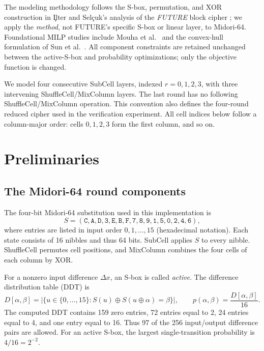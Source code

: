 \documentclass[11pt,a4paper]{article}
\begin{document}
The modeling methodology follows the S-box, permutation, and XOR construction
in \c{I}lter and Sel\c{c}uk's analysis of the \emph{FUTURE} block cipher
\cite{ilter2023}; we apply the \emph{method}, not FUTURE's specific S-box or linear
layer, to Midori-64. Foundational MILP studies include Mouha et al.~\cite{mouha2012} and the convex-hull formulation of Sun et al.~\cite{sun2014}. All component constraints are retained unchanged between the active-S-box
and probability optimizations; only the objective function is changed.

We model four consecutive SubCell layers, indexed $r=0,1,2,3$, with three
intervening ShuffleCell/MixColumn layers. The last round has no following
ShuffleCell/MixColumn operation. This convention also defines the four-round
reduced cipher used in the verification experiment. All cell indices below
follow a column-major order: cells $0,1,2,3$ form the first column, and so on.

\section{Preliminaries}
\subsection{The Midori-64 round components}
The four-bit Midori-64 substitution used in this implementation is
\[
S=(\mathtt{C},\mathtt{A},\mathtt{D},\mathtt{3},\mathtt{E},\mathtt{B},
\mathtt{F},\mathtt{7},\mathtt{8},\mathtt{9},\mathtt{1},\mathtt{5},
\mathtt{0},\mathtt{2},\mathtt{4},\mathtt{6}),
\]
where entries are listed in input order $0,1,\ldots,15$ (hexadecimal notation).
Each state consists of 16 nibbles and thus 64 bits. SubCell applies $S$ to
every nibble. ShuffleCell permutes cell positions, and MixColumn combines the
four cells of each column by XOR.

For a nonzero input difference $\Delta x$, an S-box is called \emph{active}.
The difference distribution table (DDT) is
\begin{equation}\label{eq:ddt}
 D[\alpha,\beta]
 =\bigl|\{u\in\{0,\ldots,15\}: S(u)\oplus S(u\oplus\alpha)=\beta\}\bigr|,
 \qquad p(\alpha,\beta)=\frac{D[\alpha,\beta]}{16}.
\end{equation}
The computed DDT contains 159 zero entries, 72 entries equal to 2,
24 entries equal to 4, and one entry equal to 16. Thus 97 of the 256
input/output difference pairs are allowed. For an active S-box,
the largest single-transition probability is $4/16=2^{-2}$.
\end{document}
